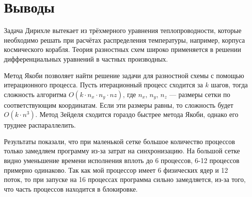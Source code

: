 \section{Выводы}
Задача Дирихле вытекает из трёхмерного уравнения теплопроводности, которые необходимо решать при расчётах распределения температуры, например, корпуса космического корабля. Теория разностных схем широко применяется в решении дифференциальных уравнений в частных производных.

Метод Якоби позволяет найти решение задачи для разностной схемы с помощью итерационного процесса. Пусть итерационный процесс сходится за $k$ шагов, тогда сложность алгоритма $O(k \cdot {n_x} \cdot {n_y} \cdot {nz})$, где $n_x$, $n_y$, $n_z$ --- размеры сетки по соответствующим координатам. Если эти размеры равны, то сложность будет $O(k \cdot n^3)$. Метод Зейделя сходится гораздо быстрее метода Якоби, однако его труднее распараллелить.

Результаты показали, что при маленькой сетке большое количество процессов только замедляем программу из-за затрат на синхронизацию. На большой сетке видно уменьшение времени исполнения вплоть до 6 процессов, 6-12 процессов примерно одинаково. Так как мой процессор имеет 6 физических ядер и 12 поток, то при запуске на 16 процессах программа сильно замедляется, из-за того, что часть процессов находится в блокировке.
\pagebreak
